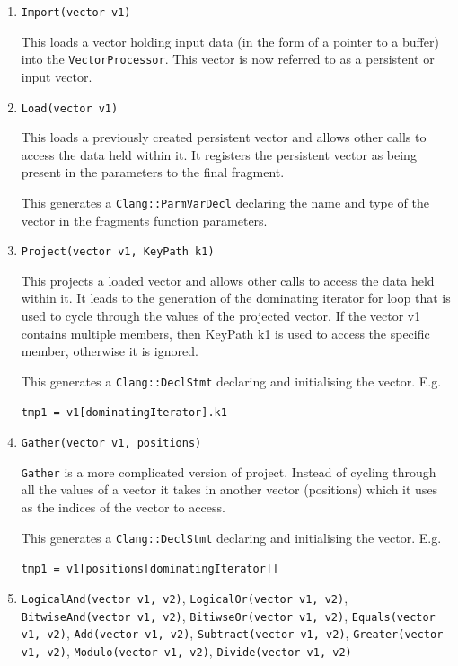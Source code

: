 \begin{enumerate}

\item \texttt{Import(vector v1)}

This loads a vector holding input data (in the form of a pointer to a buffer) into the \texttt{VectorProcessor}. This vector is now referred to as a persistent or input vector.

\item \texttt{Load(vector v1)}

This loads a previously created persistent vector and allows other calls to access the data held within it. It registers the persistent vector as being present in the parameters to the final fragment. 

This generates a \texttt{Clang::ParmVarDecl} declaring the name and type of the vector in the fragments function parameters.

\item \texttt{Project(vector v1, KeyPath k1)}

This projects a loaded vector and allows other calls to access the data held within it. It leads to the generation of the dominating iterator for loop that is used to cycle through the values of the projected vector. If the vector v1 contains multiple members, then KeyPath k1 is used to access the specific member, otherwise it is ignored.

This generates a \texttt{Clang::DeclStmt} declaring and initialising the vector. E.g.

{\centering\texttt{tmp1 = v1[dominatingIterator].k1}\par}

\item \texttt{Gather(vector v1, positions)}

\texttt{Gather} is a more complicated version of project. Instead of cycling through all the values of a vector it takes in another vector (positions) which it uses as the indices of the vector to access. 

This generates a \texttt{Clang::DeclStmt} declaring and initialising the vector. E.g. 

{\centering\texttt{tmp1 = v1[positions[dominatingIterator]]}\par}

\item \texttt{LogicalAnd(vector v1, v2)}, \texttt{LogicalOr(vector v1, v2)}, \texttt{BitwiseAnd(vector v1, v2)}, \texttt{BitiwseOr(vector v1, v2)}, \texttt{Equals(vector v1, v2)}, \texttt{Add(vector v1, v2)}, \texttt{Subtract(vector v1, v2)}, \texttt{Greater(vector v1, v2)}, \texttt{Modulo(vector v1, v2)}, \texttt{Divide(vector v1, v2)}


\end{enumerate}
